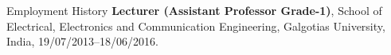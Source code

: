 \begin{rubric}{Employment History}
\entry*[2013 -- 2016]%
    \textbf{Lecturer (Assistant Professor Grade-1)}, School of Electrical, Electronics and Communication Engineering, Galgotias University, India, 19/07/2013--18/06/2016.

\end{rubric}